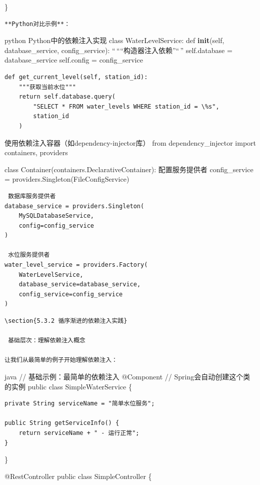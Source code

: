 \}

\begin{lstlisting}
**Python对比示例**：
\end{lstlisting}

python  Python中的依赖注入实现 class WaterLevelService: def \textbf{init}(self, database\_service, config\_service): ``\,````构造器注入依赖''``\,'' self.database = database\_service self.config = config\_service

\begin{verbatim}
def get_current_level(self, station_id):
    """获取当前水位"""
    return self.database.query(
        "SELECT * FROM water_levels WHERE station_id = \%s", 
        station_id
    )
\end{verbatim}

 使用依赖注入容器（如dependency-injector库） from dependency\_injector import containers, providers

class Container(containers.DeclarativeContainer):  配置服务提供者 config\_service = providers.Singleton(FileConfigService)

\begin{verbatim}
 数据库服务提供者
database_service = providers.Singleton(
    MySQLDatabaseService,
    config=config_service
)

 水位服务提供者
water_level_service = providers.Factory(
    WaterLevelService,
    database_service=database_service,
    config_service=config_service
)
\end{verbatim}

\begin{lstlisting}
\section{5.3.2 循序渐进的依赖注入实践}

 基础层次：理解依赖注入概念

让我们从最简单的例子开始理解依赖注入：
\end{lstlisting}

java // 基础示例：最简单的依赖注入 @Component // Spring会自动创建这个类的实例 public class SimpleWaterService \{

\begin{verbatim}
private String serviceName = "简单水位服务";

public String getServiceInfo() {
    return serviceName + " - 运行正常";
}
\end{verbatim}

\}

@RestController public class SimpleController \{

